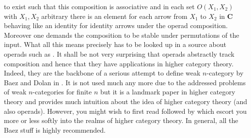 to exist such that this composition is associative and in each set $O(X_{1},X_{2})$ with $X_{1},X_{2}$ arbitrary there is an element for each arrow from $X_{1}$ to $X_{2}$ in $\mathbf{C}$ behaving like an identity for identity arrows under the operad composition. Moreover one demands the composition to be {\glqq}stable{\grqq} under permutations of the input. What all this means precisely has to be looked up in a source about operads such as \cite{0d7b89ad}. It shall be not very surprising that operads abstractly track composition and hence that they have applications in higher category theory. Indeed, they are the backbone of a serious attempt to define weak $n$-category by Baez and Dolan in \cite{0d7b89ad}. It is not used much any more due to the addressed problems of weak $n$-categories for finite $n$ but it is a landmark paper in higher category theory and provides much intuition about the idea of higher category theory (and also operads). However, you might wish to first read \cite{de09a3f9} followed by \cite{c2d89e8a} which escort you more or less softly into the realms of higher category theory. In general, all the Baez stuff is highly recommended.
